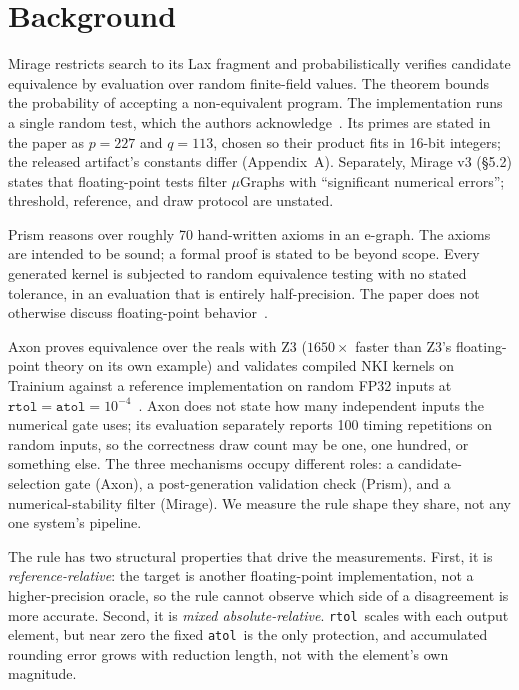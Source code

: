 \documentclass[twocolumn,10pt]{article}
\newcommand{\atol}{\texttt{atol}}
\newcommand{\rtol}{\texttt{rtol}}
\begin{document}
\section{Background}\label{sec:background}

Mirage restricts search to its Lax fragment and probabilistically
verifies candidate equivalence by evaluation over random finite-field
values. The theorem bounds the probability of accepting a non-equivalent
program. The implementation runs a single random test, which the authors
acknowledge~\cite{mirage}. Its primes are stated in the paper as
$p{=}227$ and $q{=}113$, chosen so their product fits in 16-bit
integers; the released artifact's constants differ (Appendix~A).
Separately, Mirage v3 (\S5.2) states that floating-point tests filter
$\mu$Graphs with ``significant numerical errors''; threshold, reference,
and draw protocol are unstated.

Prism reasons over roughly 70 hand-written axioms in an e-graph. The
axioms are intended to be sound; a formal proof is stated to be beyond
scope. Every generated kernel is subjected to random equivalence testing
with no stated tolerance, in an evaluation that is entirely
half-precision. The paper does not otherwise discuss floating-point
behavior~\cite{prism}.

Axon proves equivalence over the reals with Z3 ($1650\times$ faster than
Z3's floating-point theory on its own example) and validates compiled
NKI kernels on Trainium against a reference implementation on random
FP32 inputs at $\rtol=\atol=10^{-4}$~\cite{axon}. Axon does not state
how many independent inputs the numerical gate uses; its evaluation
separately reports 100 timing repetitions on random inputs, so the
correctness draw count may be one, one hundred, or something else. The
three mechanisms occupy different roles: a candidate-selection gate
(Axon), a post-generation validation check (Prism), and a
numerical-stability filter (Mirage). We measure the rule shape they
share, not any one system's pipeline.

The rule has two structural properties that drive the measurements.
First, it is \emph{reference-relative}: the target is another
floating-point implementation, not a higher-precision oracle, so the
rule cannot observe which side of a disagreement is more accurate.
Second, it is \emph{mixed absolute-relative}. \rtol\ scales with each
output element, but near zero the fixed \atol\ is the only protection,
and accumulated rounding error grows with reduction length, not with the
element's own magnitude.
\end{document}
